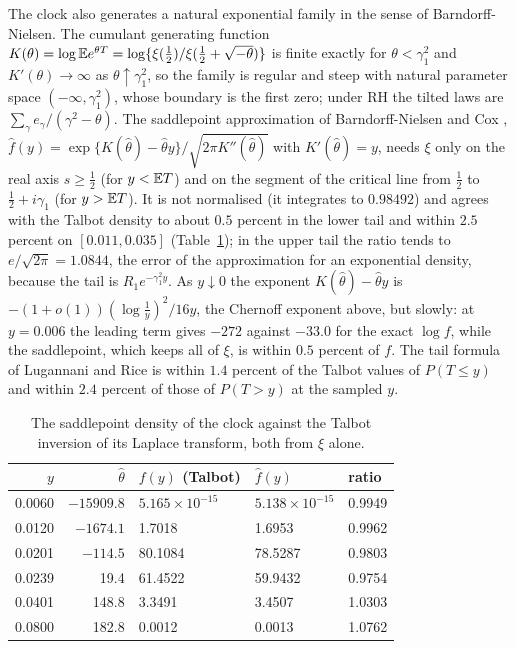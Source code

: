 The clock also generates a natural exponential family in the sense of Barndorff-Nielsen. The cumulant generating function $K(\theta)=\log\mathbb{E} e^{\theta T}=\log\{\xi(\frac12)/\xi(\frac12+\sqrt{-\theta})\}$ is finite exactly for $\theta<\gamma_1^2$ and $K'(\theta)\to\infty$ as $\theta\uparrow\gamma_1^2$, so the family is regular and steep with natural parameter space $(-\infty,\gamma_1^2)$, whose boundary is the first zero; under RH the tilted laws are $\sum_\gamma e_\gamma/(\gamma^2-\theta)$. The saddlepoint approximation of Barndorff-Nielsen and Cox \cite{BNC79}, $\hat f(y)=\exp\{K(\hat\theta)-\hat\theta y\}/\sqrt{2\pi K''(\hat\theta)}$ with $K'(\hat\theta)=y$, needs $\xi$ only on the real axis $s\ge\frac12$ (for $y<\mathbb{E} T$) and on the segment of the critical line from $\frac12$ to $\frac12+i\gamma_1$ (for $y>\mathbb{E} T$). It is not normalised (it integrates to $0.98492$) and agrees with the Talbot density to about $0.5$ percent in the lower tail and within $2.5$ percent on $[0.011,0.035]$ (Table~\ref{tx2:tab:sp}); in the upper tail the ratio tends to $e/\sqrt{2\pi}=1.0844$, the error of the approximation for an exponential density, because the tail is $R_1e^{-\gamma_1^2y}$. As $y\downarrow0$ the exponent $K(\hat\theta)-\hat\theta y$ is $-(1+o(1))(\log\frac1y)^2/16y$, the Chernoff exponent above, but slowly: at $y=0.006$ the leading term gives $-272$ against $-33.0$ for the exact $\log f$, while the saddlepoint, which keeps all of $\xi$, is within $0.5$ percent of $f$. The tail formula of Lugannani and Rice \cite{LugannaniRice80} is within $1.4$ percent of the Talbot values of $P(T\le y)$ and within $2.4$ percent of those of $P(T>y)$ at the sampled $y$.

\begin{table}[t]
\centering\small
\begin{tabular}{rrlll}
\toprule
$y$ & $\hat\theta$ & $f(y)$ (Talbot) & $\hat f(y)$ & ratio\\
\midrule
0.0060 & $-15909.8$ & $5.165\times10^{-15}$ & $5.138\times10^{-15}$ & 0.9949\\
0.0120 & $-1674.1$ & 1.7018 & 1.6953 & 0.9962\\
0.0201 & $-114.5$ & 80.1084 & 78.5287 & 0.9803\\
0.0239 & 19.4 & 61.4522 & 59.9432 & 0.9754\\
0.0401 & 148.8 & 3.3491 & 3.4507 & 1.0303\\
0.0800 & 182.8 & 0.0012 & 0.0013 & 1.0762\\
\bottomrule
\end{tabular}
\caption{The saddlepoint density of the clock against the Talbot inversion of its Laplace transform, both from $\xi$ alone.}
\label{tx2:tab:sp}
\end{table}

